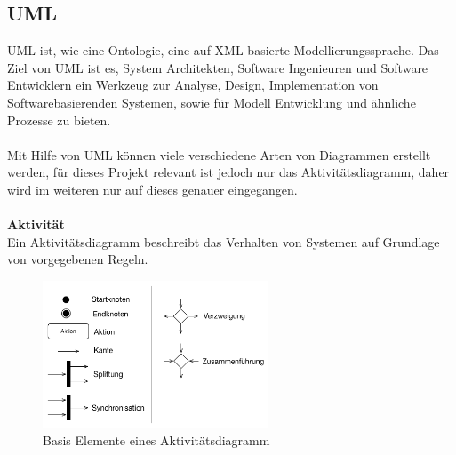 \subsection{\ac{UML}}
\ac{UML} ist, wie eine Ontologie, eine auf \ac{XML} basierte Modellierungssprache.
Das Ziel von \ac{UML} ist es, System Architekten, Software Ingenieuren und Software Entwicklern ein Werkzeug zur Analyse, Design, Implementation von Softwarebasierenden Systemen, sowie für Modell Entwicklung und ähnliche Prozesse zu bieten.\\
\\
Mit Hilfe von \ac{UML} können viele verschiedene Arten von Diagrammen erstellt werden, für dieses Projekt relevant ist jedoch nur das Aktivitätsdiagramm, daher wird im weiteren nur auf dieses genauer eingegangen.\\
\\
\textbf{Aktivität}\\
Ein Aktivitätsdiagramm beschreibt das Verhalten von Systemen auf Grundlage von vorgegebenen Regeln. \\

\begin{figure}[hbt!]
 \centering
  \includegraphics[width=0.6\textwidth]{graphics/stateoftheart/Activity_Elemente}
  \caption{Basis Elemente eines Aktivitätsdiagramm \cite{activity_list}}
\end{figure}

